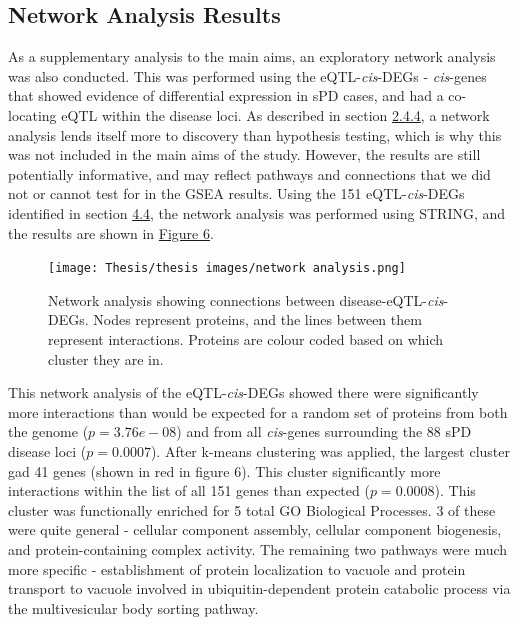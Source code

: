 \documentclass{article}
\begin{document}
\subsection{Network Analysis Results}
As a supplementary analysis to the main aims, an exploratory network analysis was also conducted. This was performed using the eQTL-\textit{cis}-DEGs - \textit{cis}-genes that showed evidence of differential expression in sPD cases, and had a co-locating eQTL within the disease loci. As described in section \hyperref[subsubsec:pathwaysandnetworks]{2.4.4}, a network analysis lends itself more to discovery than hypothesis testing, which is why this was not included in the main aims of the study. However, the results are still potentially informative, and may reflect pathways and connections that we did not or cannot test for in the GSEA results. Using the 151 eQTL-\textit{cis}-DEGs identified in section \hyperref[subsec:DGE]{4.4}, the network analysis was performed using STRING\cite{Szklarczyk2023TheInterest}, and the results are shown in \hyperref[fig:network]{Figure 6}.
\newpage
\begin{landscape}
\begin{figure}[h]
    \centering
    \texttt{[image: Thesis/thesis images/network analysis.png]}
    \caption{Network analysis showing connections between disease-eQTL-\textit{cis}-DEGs. Nodes represent proteins, and the lines between them represent interactions. Proteins are colour coded based on which cluster they are in.}
    \label{fig:network}
\end{figure}
\end{landscape}
This network analysis of the eQTL-\textit{cis}-DEGs showed there were significantly more interactions than would be expected for a random set of proteins from both the genome ($p = 3.76e-08$) and from all \textit{cis}-genes surrounding the 88 sPD disease loci ($p = 0.0007$). 
After k-means clustering was applied, the largest cluster gad 41 genes (shown in red in figure 6). This cluster significantly more interactions within the list of all 151 genes than expected ($p = 0.0008$).
This cluster was functionally enriched for 5 total GO Biological Processes. 3 of these were quite general - cellular component assembly, cellular component biogenesis, and protein-containing complex activity. The remaining two pathways were much more specific - establishment of protein localization to vacuole and protein transport to vacuole involved in ubiquitin-dependent protein catabolic process via the multivesicular body sorting pathway.
\end{document}
